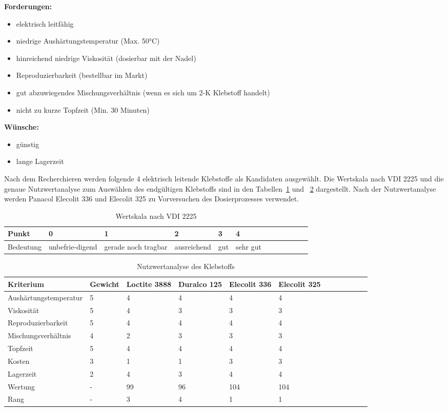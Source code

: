 {\bf Forderungen:}
\begin{itemize}
    \item elektrisch leitfähig
    \item niedrige Aushärtungstemperatur (Max. 50°C)
    \item hinreichend niedrige Viskosität (dosierbar mit der Nadel)
    \item Reproduzierbarkeit (bestellbar im Markt)
    \item gut abzuwiegendes Mischungsverhältnis (wenn es sich um 2-K Klebstoff handelt)
    \item nicht zu kurze Topfzeit (Min. 30 Minuten)
\end{itemize}
{\bf Wünsche:}
\begin{itemize}
   \item günstig
   \item lange Lagerzeit
\end{itemize}
Nach dem Recherchieren werden folgende 4 elektrisch leitende Klebstoffe als Kandidaten ausgewählt. Die Wertskala nach VDI 2225 und die genaue Nutzwertanalyse zum Auswählen des endgültigen Klebstoffs sind in den Tabellen~\ref{tab:Wertskala} und ~\ref{tab:Nutzwertanalyse} dargestellt. Nach der Nutzwertanalyse werden Panacol Elecolit 336 und Elecolit 325 zu Vorversuchen des Dosierprozesses verwendet.
\begin{table}[H]
    \centering
    \begin{tabular}{p{2cm}|p{2cm}|p{2cm}|p{2cm}|p{2cm}|p{2cm} l|l|l|l|l|l}
    \hline
         Punkt & 0 & 1 & 2 & 3 & 4 \\
         \hline
         Bedeutung & unbefrie-digend & gerade noch tragbar & ausreichend & gut & sehr gut \\
    \hline
    \end{tabular}
    \caption{Wertskala nach VDI 2225}
    \label{tab:Wertskala}
\end{table}

\begin{table}[H]
    \centering
    \begin{tabular}{p{4cm}|p{1.5cm}|p{1.5cm}|p{1.5cm}|p{1.5cm}|p{1.5cm} l|l|l|l|l|l|}
    \hline
     Kriterium  & Gewicht & Loctite 3888 & Duralco 125 & Elecolit 336 & Elecolit 325 \\
    \hline
	Aushärtungstemperatur & 5 & 4 & 4 & 4 & 4\\
	Viskosität & 5 & 4 & 3 & 3 & 3\\
	Reproduzierbarkeit & 5 & 4 & 4 & 4 & 4\\
	Mischungsverhältnis & 4 & 2 & 3 & 3 & 3\\
	Topfzeit & 5 & 4 & 4 & 4 & 4\\
	Kosten & 3 & 1 & 1 & 3 & 3\\
	Lagerzeit & 2 & 4 & 3 & 4 & 4\\
	\hline
	Wertung & - & 99 & 96 & 104 & 104\\
	\hline
	Rang & - & 3 & 4 & 1 & 1\\
	\hline
    \end{tabular}
    \caption{Nutzwertanalyse des Klebstoffs}
    \label{tab:Nutzwertanalyse}
\end{table}
